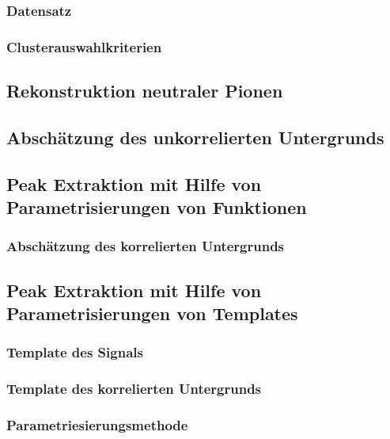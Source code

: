 \documentclass[11pt]{article}
\begin{document}
\subsubsection{Datensatz} \label{s3s1s1}

\subsubsection{Clusterauswahlkriterien} \label{s3s1s2}

\subsection{Rekonstruktion neutraler Pionen} \label{s3s2}


\subsection{Absch{\"a}tzung des unkorrelierten Untergrunds} \label{s3s3}

\subsection{Peak Extraktion mit Hilfe von Parametrisierungen von Funktionen} \label{s3s4}

\subsubsection{Absch{\"a}tzung des korrelierten Untergrunds} \label{s3s4s1}

\subsection{Peak Extraktion mit Hilfe von Parametrisierungen von Templates} \label{s3s5}

\subsubsection{Template des Signals} \label{s3s5s1}

\subsubsection{Template des korrelierten Untergrunds} \label{s3s5s2}

\subsubsection{Parametriesierungsmethode} \label{s3s5s3}
\end{document}
